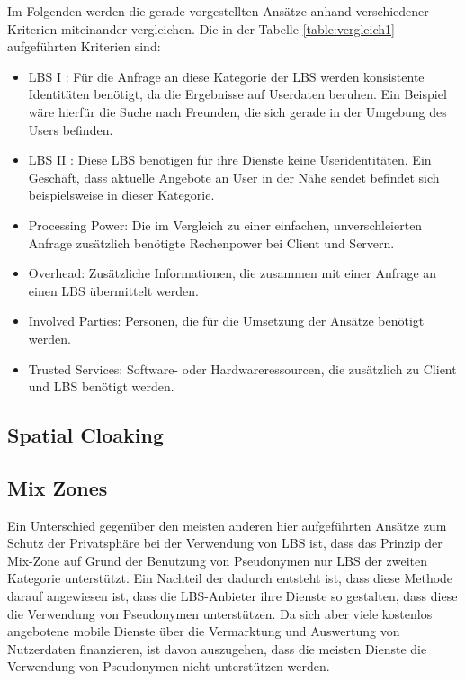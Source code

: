 Im Folgenden werden die gerade vorgestellten Ansätze anhand verschiedener Kriterien miteinander vergleichen. Die in der Tabelle \ref{table:vergleich1} aufgeführten Kriterien sind:
\begin{itemize}
	\item LBS I \cite{Chow2011}: Für die Anfrage an diese Kategorie der LBS werden konsistente Identitäten benötigt, da die Ergebnisse auf Userdaten beruhen. Ein Beispiel wäre hierfür die Suche nach Freunden, die sich gerade in der Umgebung des Users befinden.
	\item LBS II \cite{Chow2011}: Diese LBS benötigen für ihre Dienste keine Useridentitäten. Ein Geschäft, dass aktuelle Angebote an User in der Nähe sendet befindet sich beispielsweise in dieser Kategorie.
	\item Processing Power: Die im Vergleich zu einer einfachen, unverschleierten Anfrage zusätzlich benötigte Rechenpower bei Client und Servern.
	\item Overhead: Zusätzliche Informationen, die zusammen mit einer Anfrage an einen LBS übermittelt werden.
	\item Involved Parties: Personen, die für die Umsetzung der Ansätze benötigt werden.
	\item Trusted Services: Software- oder Hardwareressourcen, die zusätzlich zu Client und LBS benötigt werden.
\end{itemize}

\subsection{Spatial Cloaking}

\subsection{Mix Zones}
Ein Unterschied gegenüber den  meisten anderen hier aufgeführten Ansätze zum Schutz der Privatsphäre bei der Verwendung von LBS ist, dass das Prinzip der Mix-Zone auf Grund der Benutzung von Pseudonymen nur LBS der zweiten Kategorie unterstützt. Ein Nachteil der dadurch entsteht ist, dass diese Methode darauf angewiesen ist, dass die LBS-Anbieter ihre Dienste so gestalten, dass diese die Verwendung von Pseudonymen unterstützen. Da sich aber viele kostenlos angebotene mobile Dienste über die Vermarktung und Auswertung von Nutzerdaten finanzieren, ist davon auszugehen, dass die meisten Dienste die Verwendung von Pseudonymen nicht unterstützen werden.

